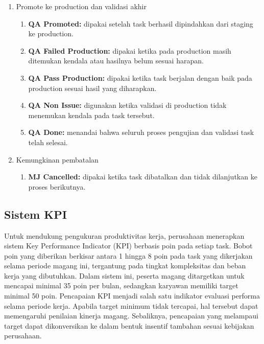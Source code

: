 \begin{enumerate}[label=\alph*.]
      \item Promote ke production dan validasi akhir
            \begin{enumerate}[label=\arabic*), noitemsep, topsep=0pt]
                  \item \textbf{QA Promoted:} dipakai setelah task berhasil dipindahkan dari staging ke production.
                  \item \textbf{QA Failed Production:} dipakai ketika pada production masih ditemukan kendala atau hasilnya belum sesuai harapan.
                  \item \textbf{QA Pass Production:} dipakai ketika task berjalan dengan baik pada production sesuai hasil yang diharapkan.
                  \item \textbf{QA Non Issue:} digunakan ketika validasi di production tidak menemukan kendala pada task tersebut.
                  \item \textbf{QA Done:} menandai bahwa seluruh proses pengujian dan validasi task telah selesai.
            \end{enumerate}

      \item Kemungkinan pembatalan
            \begin{enumerate}[label=\arabic*), noitemsep, topsep=0pt]
                  \item \textbf{MJ Cancelled:} dipakai ketika task dibatalkan dan tidak dilanjutkan ke proses berikutnya.
            \end{enumerate}
\end{enumerate}

\subsection{Sistem KPI}
Untuk mendukung pengukuran produktivitas kerja, perusahaan menerapkan sistem
Key Performance Indicator (KPI) berbasis poin pada setiap task. Bobot poin yang
diberikan berkisar antara 1 hingga 8 poin pada task yang dikerjakan selama
periode magang ini, tergantung pada tingkat kompleksitas dan beban kerja yang
dibutuhkan. Dalam sistem ini, peserta magang ditargetkan untuk mencapai minimal
35 poin per bulan, sedangkan karyawan memiliki target minimal 50 poin.
Pencapaian KPI menjadi salah satu indikator evaluasi performa selama periode
kerja. Apabila target minimum tidak tercapai, hal tersebut dapat memengaruhi
penilaian kinerja magang. Sebaliknya, pencapaian yang melampaui target dapat
dikonversikan ke dalam bentuk insentif tambahan sesuai kebijakan perusahaan.

